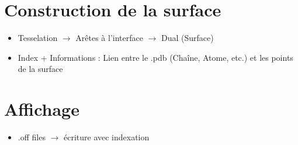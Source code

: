 \section{Construction de la surface}
\begin{itemize}
  \item Tesselation $\to$ Arêtes à l'interface $\to$ Dual (Surface)
  \item Index + Informations : Lien entre le .pdb (Chaîne, Atome, etc.) et les points de la surface
\end{itemize}

\section{Affichage}
\begin{itemize}
  \item .off files $\to$ écriture avec indexation
\end{itemize}
